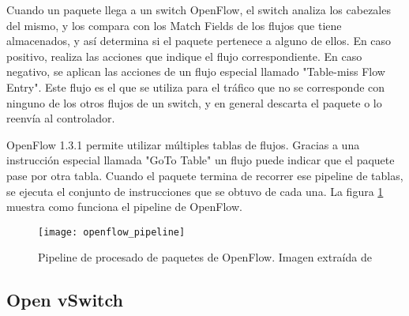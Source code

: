 Cuando un paquete llega a un switch OpenFlow, el switch analiza los cabezales del mismo, y los compara con los Match Fields de los flujos que tiene almacenados, y así determina si el paquete pertenece a alguno de ellos. En caso positivo, realiza las acciones que indique el flujo correspondiente. En caso negativo, se aplican las acciones de un flujo especial llamado "Table-miss Flow Entry". Este flujo es el que se utiliza para el tráfico que no se corresponde con ninguno de los otros flujos de un switch, y en general descarta el paquete o lo reenvía al controlador.

OpenFlow 1.3.1 permite utilizar múltiples tablas de flujos. Gracias a una instrucción especial llamada "GoTo Table" un flujo puede indicar que el paquete pase por otra tabla. Cuando el paquete termina de recorrer ese pipeline de tablas, se ejecuta el conjunto de instrucciones que se obtuvo de cada una. La figura \ref{fig:openflow_pipeline} muestra como funciona el pipeline de OpenFlow.

\begin{figure}[h] 
	\centering    
	\texttt{[image: openflow\_pipeline]}
	\caption{Pipeline de procesado de paquetes de OpenFlow. Imagen extraída de \cite{openflow-1.3.1}}
	\label{fig:openflow_pipeline}
\end{figure}

\subsection{Open vSwitch}








